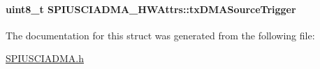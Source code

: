 \paragraph[{tx\-D\-M\-A\-Source\-Trigger}]{\setlength{\rightskip}{0pt plus 5cm}uint8\-\_\-t S\-P\-I\-U\-S\-C\-I\-A\-D\-M\-A\-\_\-\-H\-W\-Attrs\-::tx\-D\-M\-A\-Source\-Trigger}\label{struct_s_p_i_u_s_c_i_a_d_m_a___h_w_attrs_a1d2a5cd21e6ebcde08a6632b79c6231b}


The documentation for this struct was generated from the following file\-:\begin{DoxyCompactItemize}
\item 
\hyperlink{_s_p_i_u_s_c_i_a_d_m_a_8h}{S\-P\-I\-U\-S\-C\-I\-A\-D\-M\-A.\-h}\end{DoxyCompactItemize}
